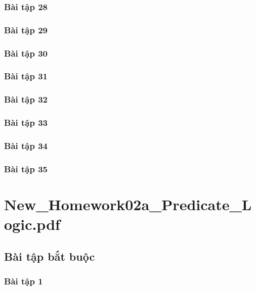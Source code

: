 \documentclass[a4paper]{article}
\begin{document}
\clearpage
\subsubsection{Bài tập 28}

\clearpage
\subsubsection{Bài tập 29}

\clearpage
\subsubsection{Bài tập 30}

\clearpage
\subsubsection{Bài tập 31}

\clearpage
\subsubsection{Bài tập 32}

\clearpage
\subsubsection{Bài tập 33}

\clearpage
\subsubsection{Bài tập 34}

\clearpage
\subsubsection{Bài tập 35}

\clearpage
\clearpage

\section{New\_Homework02a\_Predicate\_Logic.pdf}
\subsection{Bài tập bắt buộc}
\subsubsection{Bài tập 1}
\end{document}
